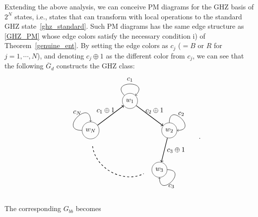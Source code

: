 \documentclass[a4paper,twocolumn,8pt,accepted=2021-12-15]{quantumarticle}
\newcommand{\nn}{\nonumber}
\def\dc{{\overline{G}_d }}
\begin{document}
	Extending the above analysis, we can conceive PM diagrams for the GHZ basis of $2^N$ states, i.e., states that can transform with local operations to the standard GHZ state~\eqref{ghz_standard}. Such PM diagrams has the same edge structure as \eqref{GHZ_PM} whose edge colors satisfy the necessary condition i) of Theorem~\ref{genuine_ent}.  
	By setting the edge colors as $c_j$ ($=B$ or $R$ for $j=1,\cdots, N$), and denoting $c_j \oplus 1$ as the different color from $c_j$, we can see that the  following $\dc$ constructs the GHZ class: 
	\begin{align}\label{GHZ_class}
		\begin{tikzpicture}[baseline={([yshift=-.5ex]current bounding box.center)}]
			\node[circle,draw] (a) at (0,3.5) {$w_1$};
			\node[circle,draw] (b) at (2,2) {$w_2$};		
			\node[circle,draw] (c) at (1.5,0) {$w_3$};
			\node[circle,draw] (e) at (-2,2) {$w_N$};		
			\path[every loop/.style={min distance=10mm,in=45,out=135,looseness=5,->},line width = 0.5pt] (a) edge [loop above] node[above] {$c_1$}   (a);
			\path[every loop/.style={min distance=10mm,in=0,out=90,looseness=5},line width = 0.5pt,->] (b) edge [loop above] node[above] {$c_2$} (b);
			\path[every loop/.style={min distance=10mm,in=270,out=0,looseness=5,->},line width = 0.5pt] (c) edge [loop above] node[below] {$c_3$} (c);
			\path[every loop/.style={min distance=10mm,in=90,out=180,looseness=5,->},line width = 0.5pt] (e) edge [loop above] node[above] {$c_N$} (e);	
			\draw[thick, dashed] (-1.9,1.2) to[bend right=55] (.7,-.2);		
			\path[line width = 0.8pt,->] (a) edge node[near start, right] {$c_2\oplus 1$} (b);
			\path[line width = 0.8pt,->] (b) edge  node[right] {$c_3\oplus 1$} (c);
			\path[line width = 0.8pt,->] (e) edge  node[near end, left] {$c_1 \oplus 1$} (a);    					
		\end{tikzpicture}. \nn 
	\end{align} The corresponding $G_{bb}$ becomes
\end{document}
